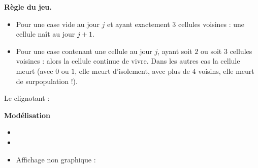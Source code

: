 \documentclass[12pt,class=report,crop=false]{standalone}
\begin{document}

\textbf{Règle du jeu.}


\begin{itemize}
  \item Pour une case vide au jour $j$ et ayant exactement $3$ cellules voisines : une cellule naît au jour $j+1$.


 \bigskip

  \item Pour une case contenant une cellule au jour $j$, ayant soit $2$ ou soit $3$ cellules voisines : alors la cellule continue de vivre.
  Dans les autres cas la cellule meurt (avec $0$ ou $1$, elle meurt d'isolement, avec plus de $4$ voisins, elle meurt de surpopulation !).
  
  
  
\end{itemize}

\newpage
 
Le \og{}clignotant\fg{} :

 
 

 \newpage
 
\textbf{Modélisation}


\begin{itemize}
  \item {}
    
  \item {} 
  
  \item Affichage non graphique :
 \begin{center}
\\
\\
\\
\\
\end{center} 
  
  \end{itemize}
\end{document}
